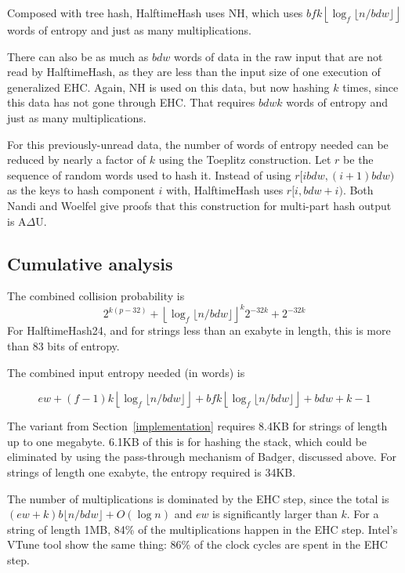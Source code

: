 \documentclass[runningheads]{llncs}
\begin{document}
Composed with tree hash, HalftimeHash uses NH, which uses $b f k \left\lfloor \log_f \lfloor n / b d w \rfloor \right\rfloor$ words of entropy and just as many multiplications.

There can also be as much as $b d w$ words of data in the raw input that are not read by HalftimeHash, as they are less than the input size of one execution of generalized EHC.
Again, NH is used on this data, but now hashing $k$ times, since this data has not gone through EHC.
That requires $b d w k$ words of entropy and just as many multiplications.

For this previously-unread data, the number of words of entropy needed can be reduced by nearly a factor of $k$ using the Toeplitz construction.
Let $r$ be the sequence of random words used to hash it.
Instead of using $r[i b d w, (i+1)b d w)$ as the keys to hash component $i$ with, HalftimeHash uses $r[i, b d w + i)$.
Both Nandi and Woelfel give proofs that this construction for multi-part hash output is A$\Delta$U. \cite{ehc-nandi,woelfel-toeplitz}

\subsection{Cumulative analysis}

The combined collision probability is
\[2^{k(p-32)} + \left\lfloor \log_f \lfloor n / b d w \rfloor \right\rfloor^k 2^{-32k} + 2^{-32k}\]
For HalftimeHash24, and for strings less than an exabyte in length, this is more than 83 bits of entropy.

The combined input entropy needed (in words) is

\[
e w
+ (f-1) k \left\lfloor\log_f \lfloor n/b d w\rfloor\right\rfloor
+ b f k \left\lfloor\log_f \lfloor n/b d w\rfloor\right\rfloor
+ b d w + k - 1
\]

The variant from Section~\ref{implementation} requires 8.4KB for strings of length up to one megabyte.
6.1KB of this is for hashing the stack, which could be eliminated by using the pass-through mechanism of Badger, discussed above.
For strings of length one exabyte, the entropy required is 34KB.

The number of multiplications is dominated by the EHC step, since the total is $(e w + k) b \lfloor n / b d w \rfloor + O(\log n)$ and $e w$ is significantly larger than $k$.
For a string of length 1MB, 84\% of the multiplications happen in the EHC step. %
Intel's VTune tool show the same thing: 86\% of the clock cycles are spent in the EHC step.
\end{document}
